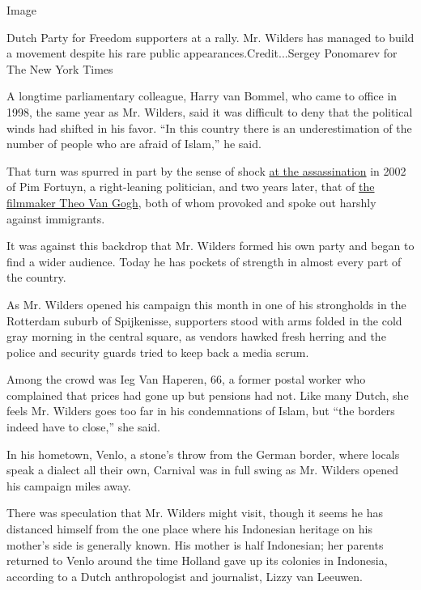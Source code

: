 Image

Dutch Party for Freedom supporters at a rally. Mr. Wilders has managed
to build a movement despite his rare public appearances.Credit...Sergey
Ponomarev for The New York Times

A longtime parliamentary colleague, Harry van Bommel, who came to office
in 1998, the same year as Mr. Wilders, said it was difficult to deny
that the political winds had shifted in his favor. ``In this country
there is an underestimation of the number of people who are afraid of
Islam,'' he said.

That turn was spurred in part by the sense of shock
\href{http://www.nytimes.com/2002/05/07/world/rightist-candidate-in-netherlands-is-slain-and-the-nation-is-stunned.html}{at
the assassination} in 2002 of Pim Fortuyn, a right-leaning politician,
and two years later, that of
\href{http://www.nytimes.com/2004/11/03/world/europe/dutch-filmmaker-an-islam-critic-is-killed.html?_r=0}{the
filmmaker Theo Van Gogh}, both of whom provoked and spoke out harshly
against immigrants.

It was against this backdrop that Mr. Wilders formed his own party and
began to find a wider audience. Today he has pockets of strength in
almost every part of the country.

As Mr. Wilders opened his campaign this month in one of his strongholds
in the Rotterdam suburb of Spijkenisse, supporters stood with arms
folded in the cold gray morning in the central square, as vendors hawked
fresh herring and the police and security guards tried to keep back a
media scrum.

Among the crowd was Ieg Van Haperen, 66, a former postal worker who
complained that prices had gone up but pensions had not. Like many
Dutch, she feels Mr. Wilders goes too far in his condemnations of Islam,
but ``the borders indeed have to close,'' she said.

In his hometown, Venlo, a stone's throw from the German border, where
locals speak a dialect all their own, Carnival was in full swing as Mr.
Wilders opened his campaign miles away.

There was speculation that Mr. Wilders might visit, though it seems he
has distanced himself from the one place where his Indonesian heritage
on his mother's side is generally known. His mother is half Indonesian;
her parents returned to Venlo around the time Holland gave up its
colonies in Indonesia, according to a Dutch anthropologist and
journalist, Lizzy van Leeuwen.

